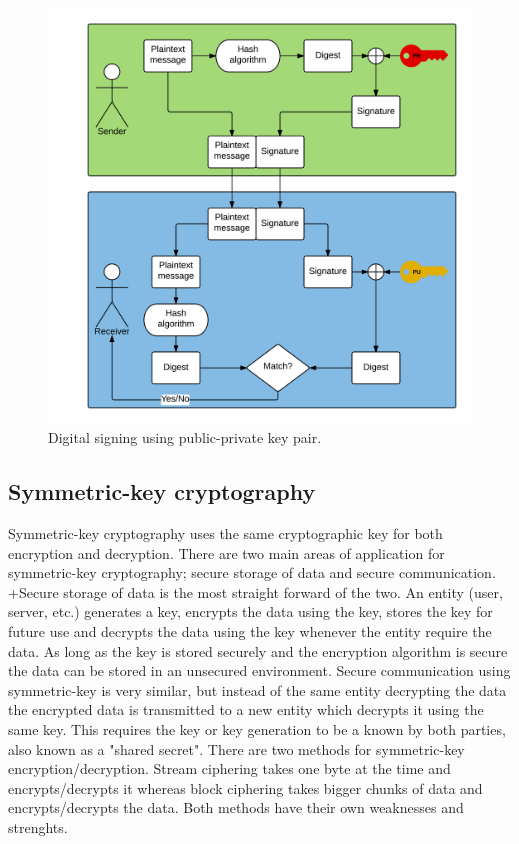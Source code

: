 \begin{figure}[h!]
  \captionsetup{justification=centering,margin=1.5cm}
  \caption{Digital signing using public-private key pair.}
  \label{fig:signing_basic}
  \centering
    \includegraphics[width=1\textwidth]{images/signing_basic.png}
\end{figure}

\subsection{Symmetric-key cryptography}
Symmetric-key cryptography uses the same cryptographic key for both encryption and decryption. There are two main areas of application for symmetric-key cryptography; secure storage of data and secure communication. +Secure storage of data is the most straight forward of the two. An entity (user, server, etc.) generates a key, encrypts the data using the key, stores the key for future use and decrypts the data using the key whenever the entity require the data. As long as the key is stored securely and the encryption algorithm is secure the data can be stored in an unsecured environment. Secure communication using symmetric-key is very similar, but instead of the same entity decrypting the data the encrypted data is transmitted to a new entity which decrypts it using the same key. This requires the key or key generation to be a known by both parties, also known as a "shared secret". There are two methods for symmetric-key encryption/decryption. Stream ciphering takes one byte at the time and encrypts/decrypts it whereas block ciphering takes bigger chunks of data and encrypts/decrypts the data. Both methods have their own weaknesses and strenghts.

